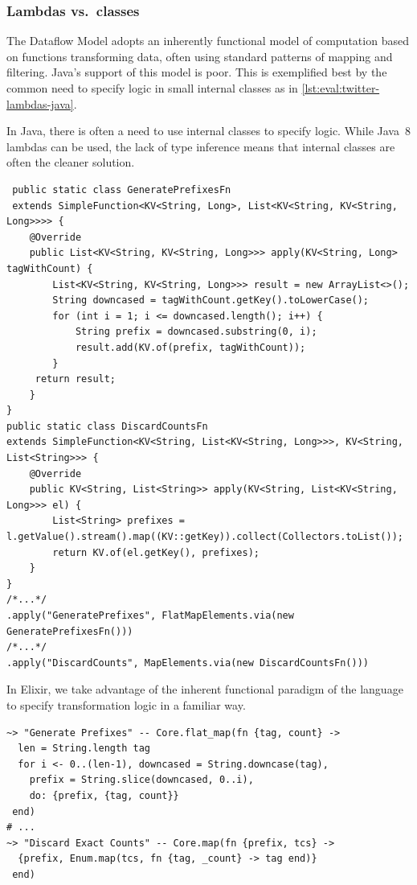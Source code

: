 \subsubsection{Lambdas vs.\ classes}

The Dataflow Model adopts an inherently functional model of computation based on functions transforming data, often using standard patterns of mapping and filtering.
Java's support of this model is poor.
This is exemplified best by the common need to specify logic in small internal classes as in \cref{lst:eval:twitter-lambdas-java}.

\begin{codelisting}
	\caption[Using internal classes to specify transformation logic in Java.]{In Java, there is often a need to use internal classes to specify logic. While Java~8 lambdas can be used, the lack of  type inference means that internal classes are often the cleaner solution.}
	\label{lst:eval:twitter-lambdas-java}
	\begin{verbatim}
 public static class GeneratePrefixesFn
 extends SimpleFunction<KV<String, Long>, List<KV<String, KV<String, Long>>>> {
    @Override
    public List<KV<String, KV<String, Long>>> apply(KV<String, Long> tagWithCount) {
        List<KV<String, KV<String, Long>>> result = new ArrayList<>();
        String downcased = tagWithCount.getKey().toLowerCase();
        for (int i = 1; i <= downcased.length(); i++) {
            String prefix = downcased.substring(0, i);
            result.add(KV.of(prefix, tagWithCount));
        }
     return result;
    }
}
public static class DiscardCountsFn
extends SimpleFunction<KV<String, List<KV<String, Long>>>, KV<String, List<String>>> {
    @Override
    public KV<String, List<String>> apply(KV<String, List<KV<String, Long>>> el) {
        List<String> prefixes = l.getValue().stream().map((KV::getKey)).collect(Collectors.toList());
        return KV.of(el.getKey(), prefixes);
    }
}
/*...*/
.apply("GeneratePrefixes", FlatMapElements.via(new GeneratePrefixesFn()))
/*...*/
.apply("DiscardCounts", MapElements.via(new DiscardCountsFn()))
	\end{verbatim}
\end{codelisting}

\begin{codelisting}
	\caption[Using lambdas to specify transformation logic in Elixir.]{In Elixir, we take advantage of the inherent functional paradigm of the language to specify transformation logic in a familiar way.}
	\label{lst:eval:twitter-lambdas-elixir}
	\begin{verbatim}
~> "Generate Prefixes" -- Core.flat_map(fn {tag, count} ->
  len = String.length tag
  for i <- 0..(len-1), downcased = String.downcase(tag),
    prefix = String.slice(downcased, 0..i),
    do: {prefix, {tag, count}}
 end)
# ...
~> "Discard Exact Counts" -- Core.map(fn {prefix, tcs} ->
  {prefix, Enum.map(tcs, fn {tag, _count} -> tag end)}
 end)
	\end{verbatim}
\end{codelisting}

